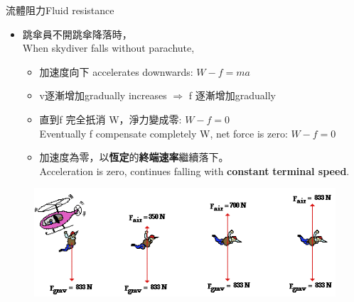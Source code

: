 \documentclass[beamer=true]{standalone}
\begin{document}
\begin{frame}{流體阻力Fluid resistance}
    \begin{itemize}
        \item 跳傘員不開跳傘降落時，\\When skydiver falls without parachute,
              \begin{itemize}
                  \item 加速度向下 accelerates downwards: $W-f=ma$
                  \item v逐漸增加gradually increases $\Rightarrow$ f 逐漸增加gradually
                  \item 直到f 完全扺消 W，淨力變成零:  $W-f=0$ \\Eventually f compensate completely W, net force is zero:  $W-f=0$
                  \item 加速度為零，以\textbf{恆定}的\textbf{終端速率}繼續落下。\\Acceleration is zero, continues falling with \textbf{constant} \textbf{terminal speed}.
              \end{itemize}
    \end{itemize}
    \begin{figure}[h!]
        \centering
        \includegraphics[width=.7\textwidth]{assets/e052106e.png}
    \end{figure}
\end{frame}
\end{document}
